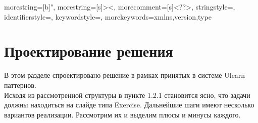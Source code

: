 


{
  morestring=[b]",
  morestring=[s]{>}{<},
  morecomment=[s]{<?}{?>},
  stringstyle=\color{black},
  identifierstyle=\color{darkblue},
  keywordstyle=\color{cyan},
  morekeywords={xmlns,version,type}%
}



\section{Проектирование решения}
\label{cha:design}


В этом разделе спроектировано решение в рамках принятых в системе Ulearn паттернов.
\\


Исходя из рассмотренной структуры в пункте 1.2.1 становится ясно, что задачи должны находиться на слайде типа Exercise. Дальнейшие шаги имеют несколько вариантов реализации. Рассмотрим их и выделим плюсы и минусы каждого.


